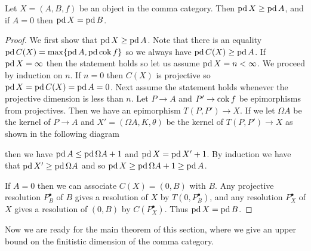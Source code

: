\begin{prop}\cite[Lemma~4.16]{FGR75}\label{prop:pd_in_commacat}
	Let $X = (A, B, f)$ be an object in the comma category. Then $\operatorname{pd} X \geq \operatorname{pd} A$, and if $A=0$ then $\operatorname{pd} X = \operatorname{pd} B$.
	\begin{proof}
		We first show that $\operatorname{pd} X \geq \operatorname{pd} A$. Note that there is an equality $\operatorname{pd} C(X) = \max\{ \operatorname{pd} A, \operatorname{pd} \operatorname{cok} f \}$ so we always have $\operatorname{pd} C(X) \geq \operatorname{pd} A$. If $\operatorname{pd} X = \infty$ then the statement holds so let us assume $\operatorname{pd} X = n < \infty$. We proceed by induction on $n$. If $n=0$ then $C(X)$ is projective so $\operatorname{pd} X = \operatorname{pd} C(X) = \operatorname{pd} A = 0$. Next assume the statement holds whenever the projective dimension is less than $n$. Let $P \to A$ and $P' \to \operatorname{cok} f$ be epimorphisms from projectives. Then we have an epimorphism $T(P, P') \to X$. If we let $\Omega A$ be the kernel of $P \to A$ and $X' = (\Omega A, K, \theta)$ be the kernel of $T(P, P') \to X$ as shown in the following diagram
		\begin{center}
		\end{center}
		then we have $\operatorname{pd} A \leq \operatorname{pd} \Omega A + 1$ and $\operatorname{pd} X = \operatorname{pd} X' + 1$. By induction we have that $\operatorname{pd} X' \geq \operatorname{pd} \Omega A$ and so $\operatorname{pd} X \geq \operatorname{pd} \Omega A +1 \geq \operatorname{pd} A$. 
		
		If $A=0$ then we can associate $C(X)=(0, B)$ with $B$. Any projective resolution $P_B^\bullet$ of $B$ gives a resolution of $X$ by $T(0, P_B^\bullet)$, and any resolution $P_X^\bullet$ of $X$ gives a resolution of $(0, B)$ by $C(P_X^\bullet)$. Thus $\operatorname{pd} X = \operatorname{pd} B$.
	\end{proof}
\end{prop}

Now we are ready for the main theorem of this section, where we give an upper bound on the finitistic dimension of the comma category.


